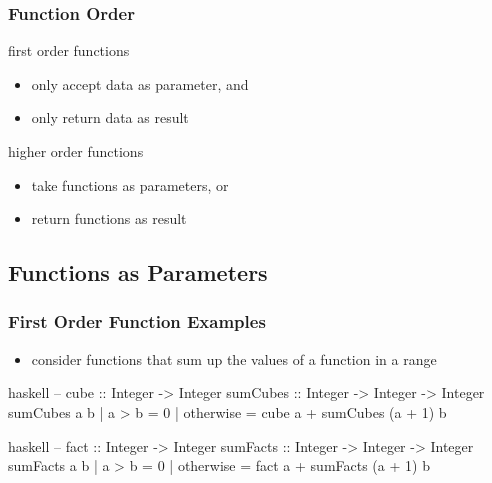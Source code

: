 \documentclass[dvipsnames]{beamer}
\theoremstyle{plain}
\begin{document}
\begin{frame}[fragile]
  \frametitle{Function Order}

  \begin{definition}
    \alert{first order functions}
    \begin{itemize}
      \item only accept data as parameter, and
      \item only return data as result
    \end{itemize}

    \bigskip
    \alert{higher order functions}
    \begin{itemize}
      \item take functions as parameters, or
      \item return functions as result
    \end{itemize}
  \end{definition}
\end{frame}

\subsection{Functions as Parameters}

\begin{frame}[fragile]
  \frametitle{First Order Function Examples}

  \begin{itemize}
    \item consider functions that sum up the values of a function in a range
  \end{itemize}

  \begin{exampleblock}{}
    \begin{pygments}{haskell}
-- cube :: Integer -> Integer
sumCubes :: Integer -> Integer -> Integer
sumCubes a b
  | a > b     = 0
  | otherwise = cube a + sumCubes (a + 1) b
    \end{pygments}

    \pause
    \begin{pygments}{haskell}
-- fact :: Integer -> Integer
sumFacts :: Integer -> Integer -> Integer
sumFacts a b
  | a > b     = 0
  | otherwise = fact a + sumFacts (a + 1) b
    \end{pygments}
  \end{exampleblock}
\end{frame}
\end{document}
